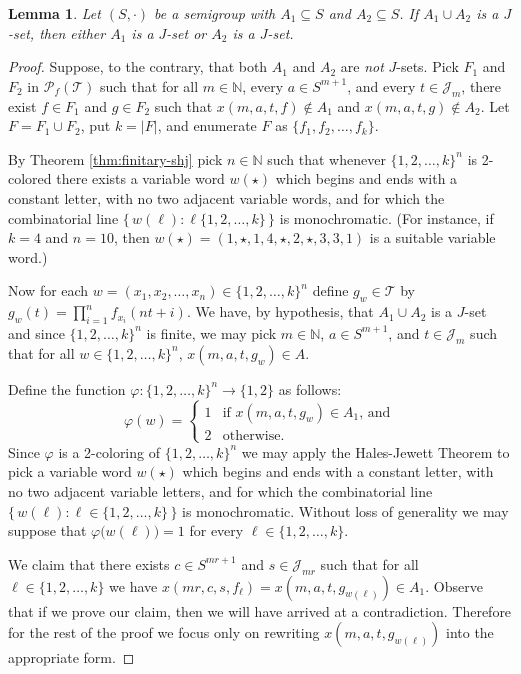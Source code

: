 \documentclass[12pt,showtrims]{memoir}
\theoremstyle{plain}
\newtheorem{lem}[thm]{Lemma}
\theoremstyle{definition}
\newcommand{\bbN}{\mathbb{N}}
\newcommand{\calJ}{\mathcal{J}}
\newcommand{\calT}{\mathcal{T}}
\newcommand{\Pf}{\mathcal{P}_f}
\begin{document}
\begin{lem}
  \label{lem:pr-jsets}
  Let $(S, \cdot)$ be a semigroup with $A_1 \subseteq S$ and $A_2 \subseteq S$.
  If $A_1 \cup A_2$ is a $J$-set, then either $A_1$ is a $J$-set or $A_2$ is a $J$-set.
\end{lem}
\begin{proof}
  Suppose, to the contrary, that both $A_1$ and $A_2$ are \textsl{not} $J$-sets.
  Pick $F_1$ and $F_2$ in $\Pf(\calT)$ such that for all $m \in \bbN$, every $a \in S^{m+1}$, and every $t \in \calJ_m$, there exist $f \in F_1$ and $g \in F_2$ such that $x(m, a, t, f) \not\in A_1$ and $x(m, a, t, g) \not\in A_2$.
  Let $F = F_1 \cup F_2$, put $k = |F|$, and enumerate $F$ as $\{f_1, f_2, \ldots, f_k\}$.

  By Theorem \ref{thm:finitary-shj} pick $n \in \bbN$ such that whenever $\{1, 2, \ldots, k\}^n$ is 2-colored there exists a variable word $w(\star)$ which begins and ends with a constant letter, with no two adjacent variable words, and for which the combinatorial line $\bigl\{\, w(\ell) : \ell \{1, 2, \ldots, k\} \,\bigr\}$ is monochromatic. 
  (For instance, if $k = 4$ and $n = 10$, then $w(\star) = (1, \star, 1, 4, \star, 2, \star, 3, 3, 1)$ is a suitable variable word.)

  Now for each $w = (x_1, x_2, \ldots, x_n) \in \{1, 2, \ldots, k\}^n$ define $g_w \in \calT$ by $g_w(t) = \prod_{i=1}^n f_{x_i}(nt + i)$.
  We have, by hypothesis, that $A_1 \cup A_2$ is a $J$-set and since $\{1, 2, \ldots, k\}^n$ is finite, we may pick $m \in \bbN$, $a \in S^{m+1}$, and $t \in \calJ_m$ such that for all $w \in \{1, 2, \ldots, k\}^n$, $x(m, a, t, g_w) \in A$.

  Define the function $\varphi \colon \{1, 2, \ldots, k\}^n \to \{1, 2\}$ as follows:
  \[
    \varphi(w) = 
    \begin{cases}
      1 & \mbox{if $x(m, a, t, g_w) \in A_1$, and} \\
      2 & \mbox{otherwise.}
    \end{cases}
  \]
  Since $\varphi$ is a 2-coloring of $\{1, 2, \ldots, k\}^n$ we may apply the Hales-Jewett Theorem to pick a variable word $w(\star)$ which begins and ends with a constant letter, with no two adjacent variable letters, and for which the combinatorial line $\bigl\{\, w(\ell) : \ell \in \{1, 2, \ldots, k\} \,\bigr\}$ is monochromatic. 
  Without loss of generality we may suppose that $\varphi \bigl( w(\ell) \bigr) = 1$ for every $\ell \in \{1, 2, \ldots, k\}$.

  We claim that there exists $c \in S^{mr+1}$ and $s \in \calJ_{mr}$ such that for all $\ell \in \{1, 2, \ldots, k\}$ we have $x(mr, c, s, f_\ell) = x(m, a, t, g_{w(\ell)}) \in A_1$. 
  Observe that if we prove our claim, then we will have arrived at a contradiction. 
  Therefore for the rest of the proof we focus only on rewriting $x(m, a, t, g_{w(\ell)})$ into the appropriate form.


\end{proof}
\end{document}
